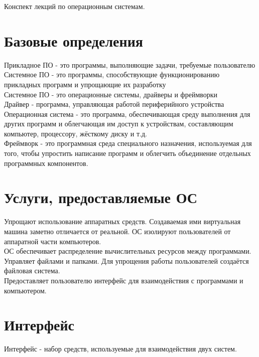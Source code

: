 \documentclass[a4paper]{article}
\begin{document}
\begin{center}
	Конспект лекций по операционным системам.
\end{center}
\section*{Базовые определения}
Прикладное ПО - это программы, выполняющие задачи, требуемые пользователю\\
Системное ПО - это программы, способствующие функционированию прикладных программ и упрощающие их разработку\\
Системное ПО - это операционные системы, драйверы и фреймворки\\
Драйвер - программа, управляющая работой периферийного устройства\\
Операционная система - это программа, обеспечивающая среду выполнения для других программ и облегчающая им доступ к устройствам, составляющим компьютер, процессору, жёсткому диску и т.д.  \\
Фреймворк - это программная среда специального назначения, используемая для того, чтобы упростить написание программ и облегчить объединение отдельных программных компонентов.\\
\section*{Услуги, предоставляемые ОС}
Упрощают использование аппаратных средств. Создаваемая ими виртуальная машина заметно отличается от реальной. ОС изолируют пользователей от аппаратной части компьютеров.\\
ОС обеспечивает распределение вычислительных ресурсов между программами.\\
Управляет файлами и папками. Для упрощения работы пользователей создаётся файловая система.\\
Предоставляет пользователю интерфейс для взаимодействия с программами и компьютером.\\
\section*{Интерфейс}
Интерфейс - набор средств, используемые для взаимодействия двух систем.\\
\end{document}
